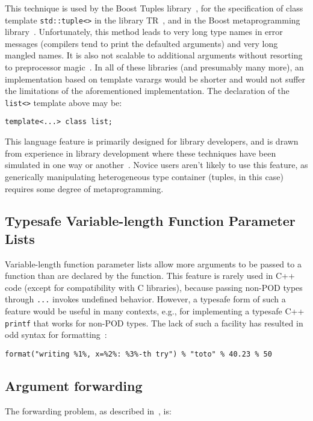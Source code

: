 \documentclass{article}
\begin{document}
This technique is used by the Boost Tuples library~\cite{Tuples01},
for the specification of class template {\tt std::tuple<>} in the
library TR~\cite{Jarvi02}, and in the Boost metaprogramming
library~\cite{Gurtovoy02}. Unfortunately, this method leads to very
long type names in error messages (compilers tend to print the
defaulted arguments) and very long mangled names. It is also not
scalable to additional arguments without resorting to preprocessor
magic~\cite{Preprocessor01}. In all of these libraries (and presumably
many more), an implementation based on template varargs would be
shorter and would not suffer the limitations of the aforementioned
implementation. The declaration of the {\tt list<>} template above may
be:
\begin{verbatim}
template<...> class list;
\end{verbatim}

This language feature is primarily designed for library developers,
and is drawn from experience in library development where these
techniques have been simulated in one way or
another~\cite{Gurtovoy02,Lambda02,Tuples01,Function01,Bind01}. Novice
users aren't likely to use this feature, as generically manipulating
heterogeneous type container (tuples, in this case) requires some
degree of metaprogramming.

\subsection{Typesafe Variable-length Function Parameter Lists}
Variable-length function parameter lists allow more arguments to be
passed to a function than are declared by the function. This feature
is rarely used in C++ code (except for compatibility with C
libraries), because passing non-POD types through {\tt ...} invokes
undefined behavior. However, a typesafe form of such a feature would
be useful in many contexts, e.g., for implementing a typesafe C++
{\tt printf} that works for non-POD types. The lack of such a facility
has resulted in odd syntax for formatting~\cite{Krempp02}:
\begin{verbatim}
format("writing %1%, x=%2%: %3%-th try") % "toto" % 40.23 % 50
\end{verbatim}

\subsection{Argument forwarding}
The forwarding problem, as described in~\cite{Dimov02}, is:
\end{document}
